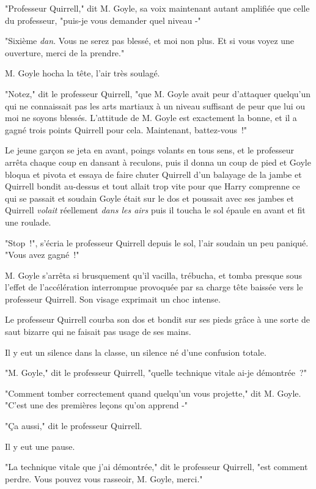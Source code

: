 "Professeur Quirrell," dit M. Goyle, sa voix maintenant autant amplifiée que celle du professeur, "puis-je vous demander quel niveau -"

"Sixième \emph{dan}. Vous ne serez pas blessé, et moi non plus. Et si vous voyez une ouverture, merci de la prendre."

M. Goyle hocha la tête, l'air très soulagé.

"Notez," dit le professeur Quirrell, "que M. Goyle avait peur d'attaquer quelqu'un qui ne connaissait pas les arts martiaux à un niveau suffisant de peur que lui ou moi ne soyons blessés. L'attitude de M. Goyle est exactement la bonne, et il a gagné trois points Quirrell pour cela. Maintenant, battez-vous~!"

Le jeune garçon se jeta en avant, poings volants en tous sens, et le professeur arrêta chaque coup en dansant à reculons, puis il donna un coup de pied et Goyle bloqua et pivota et essaya de faire chuter Quirrell d'un balayage de la jambe et Quirrell bondit au-dessus et tout allait trop vite pour que Harry comprenne ce qui se passait et soudain Goyle était sur le dos et poussait avec ses jambes et Quirrell \emph{volait} réellement \emph{dans les airs} puis il toucha le sol épaule en avant et fit une roulade.

"Stop~!", s'écria le professeur Quirrell depuis le sol, l'air soudain un peu paniqué. "Vous avez gagné~!"

M. Goyle s'arrêta si brusquement qu'il vacilla, trébucha, et tomba presque sous l'effet de l'accélération interrompue provoquée par sa charge tête baissée vers le professeur Quirrell. Son visage exprimait un choc intense.

Le professeur Quirrell courba son dos et bondit sur ses pieds grâce à une sorte de saut bizarre qui ne faisait pas usage de ses mains.

Il y eut un silence dans la classe, un silence né d'une confusion totale.

"M. Goyle," dit le professeur Quirrell, "quelle technique vitale ai-je démontrée~?"

"Comment tomber correctement quand quelqu'un vous projette," dit M. Goyle. "C'est une des premières leçons qu'on apprend -"

"Ça aussi," dit le professeur Quirrell.

Il y eut une pause.

"La technique vitale que j'ai démontrée," dit le professeur Quirrell, "est comment perdre. Vous pouvez vous rasseoir, M. Goyle, merci."

